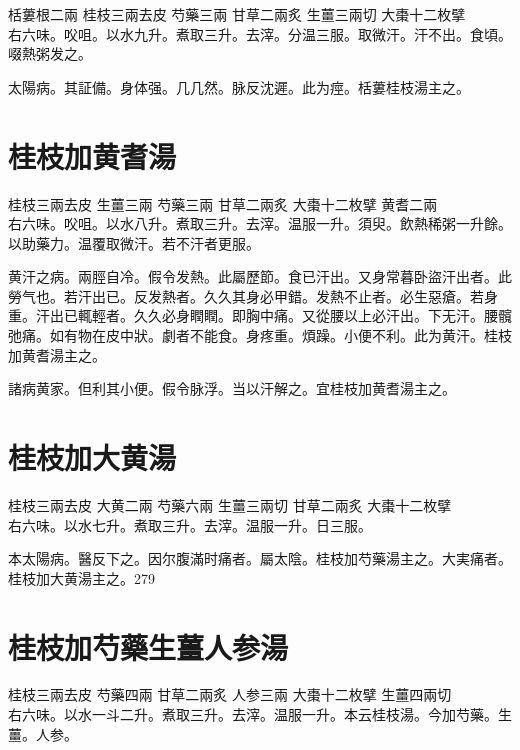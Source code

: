 栝蔞根{\scriptsize 二兩} 桂枝{\scriptsize 三兩去皮} 芍藥{\scriptsize 三兩} 甘草{\scriptsize 二兩炙} 生薑{\scriptsize 三兩切} 大棗{\scriptsize 十二枚擘}\\
右六味。㕮咀。以水九升。煮取三升。去滓。分温三服。取微汗。汗不出。食頃。啜熱粥发之。

太陽病。其証備。身体强。几几然。脉反沈遲。此为痙。栝蔞桂枝湯主之。

\section{桂枝加黄耆湯}

桂枝{\scriptsize 三兩去皮} 生薑{\scriptsize 三兩} 芍藥{\scriptsize 三兩} 甘草{\scriptsize 二兩炙} 大棗{\scriptsize 十二枚擘} 黄耆{\scriptsize 二兩}\\
右六味。㕮咀。以水八升。煮取三升。去滓。温服一升。須臾。飲熱稀粥一升餘。以助藥力。温覆取微汗。若不汗者更服。

黄汗之病。兩脛自冷。假令发熱。此屬歷節。食已汗出。又身常暮{\khaai 卧}盜汗出者。此勞气也。若汗出已。反发熱者。久久其身必甲錯。发熱不止者。必生惡瘡。若身重。汗出已輒輕者。久久必身瞤瞤。即胸中痛。又從腰以上必汗出。下无汗。腰髖弛痛。如有物在皮中狀。劇者不能食。身疼重。煩躁。小便不利。此为黄汗。桂枝加黄耆湯主之。

諸病黄家。但利其小便。假令脉浮。当以汗解之。宜桂枝加黄耆湯主之。

\section{桂枝加大黄湯}

桂枝{\scriptsize 三兩去皮} 大黄{\scriptsize 二兩} 芍藥{\scriptsize 六兩} 生薑{\scriptsize 三兩切} 甘草{\scriptsize 二兩炙} 大棗{\scriptsize 十二枚擘}\\
右六味。以水七升。煮取三升。去滓。温服一升。日三服。

{\khaai 本}太陽病。醫反下之。因尔腹滿时痛者。屬太陰。桂枝加芍藥湯主之。大実痛者。桂枝加大黄湯主之。279

\section{桂枝加芍藥生薑人参湯}

桂枝{\scriptsize 三兩去皮} 芍藥{\scriptsize 四兩} 甘草{\scriptsize 二兩炙} 人参{\scriptsize 三兩} 大棗{\scriptsize 十二枚擘} 生薑{\scriptsize 四兩切}\\
右六味。以水一斗二升。煮取三升。去滓。温服一升。本云桂枝湯。今加芍藥。生薑。人参。

